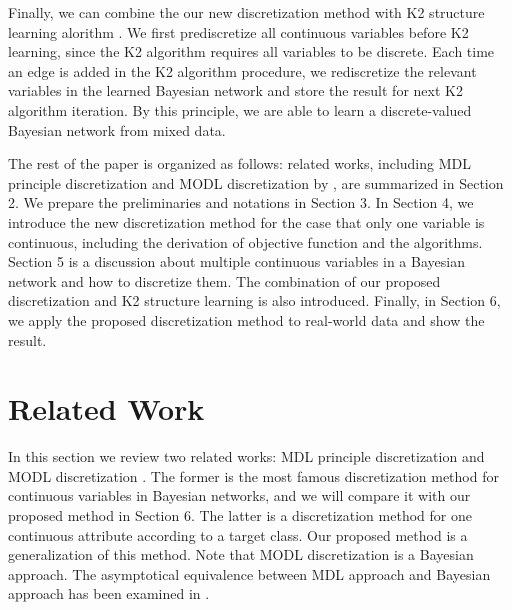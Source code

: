 Finally, we can combine the our new discretization method with K2 structure learning alorithm \citep{K2}. We first prediscretize all continuous variables before K2 learning, since the K2 algorithm requires all variables to be discrete. Each time an edge is added in the K2 algorithm procedure, we rediscretize the relevant variables in the learned Bayesian network and store the result for next K2 algorithm iteration. By this principle, we are able to learn a discrete-valued Bayesian network from mixed data.

The rest of the paper is organized as follows: related works, including MDL principle discretization \citep{Friedman_1996} and MODL discretization by \citet{Boulle_2006}, are summarized in Section 2. We prepare the preliminaries and notations in Section 3. In Section 4, we introduce the new discretization method for the case that only one variable is continuous, including the derivation of objective function and the algorithms. Section 5 is a discussion about multiple continuous variables in a Bayesian network and how to discretize them. The combination of our proposed discretization and K2 structure learning is also introduced. Finally, in Section 6, we apply the proposed discretization method to real-world data and show the result.

\section{Related Work}
\label{relat_work}
In this section we review two related works: MDL principle discretization \citep{Friedman_1996} and MODL discretization \citep{Boulle_2006}. The former is the most famous discretization method for continuous variables in Bayesian networks, and we will compare it with our proposed method in Section 6. The latter is a discretization method for one continuous attribute according to a target class. Our proposed method is a generalization of this method. Note that MODL discretization is a Bayesian approach. The asymptotical equivalence between MDL approach and Bayesian approach has been examined in \citep{VL_2000}.
